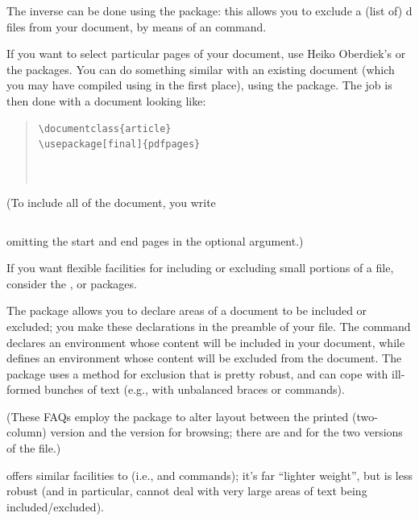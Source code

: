 The inverse can be done using the  package: this
allows you to exclude a (list of) d files from your
document, by means of an  command.

If you want to select particular pages of your document, use Heiko
Oberdiek's  or the  packages.  You
can do something similar with an existing  document (which
you may have compiled using  in the first place),
using the  package.  The job is then done with a
document looking like:
\begin{quote}
\begin{verbatim}
\documentclass{article}
\usepackage[final]{pdfpages}



\end{verbatim}
\end{quote}
(To include all of the document, you write
\begin{quote}
\begin{verbatim}

\end{verbatim}
\end{quote}
omitting the start and end pages in the optional argument.)

If you want flexible facilities for including or excluding small
portions of a file, consider the ,  or
 packages.

The  package allows you to declare areas of a document to be
included or excluded; you make these declarations in the preamble of
your file.  The command 
declares an environment  whose content will
be included in your document, while
 defines an environment whose
content will be excluded from the document.  The package uses a method
for exclusion that is pretty robust, and can cope with ill-formed
bunches of text (e.g., with unbalanced braces or  commands).

(These FAQs employ the  package to alter layout
between the printed (two-column) version and the  version
for browsing; there are  and
 for the two versions of the file.)

 offers similar facilities to 
(i.e.,  and  commands);
it's far ``lighter weight'', but is less robust (and in particular,
cannot deal with very large areas of text being included/excluded).

